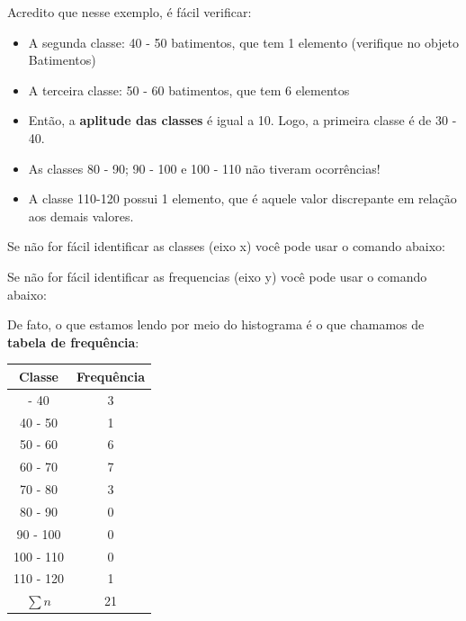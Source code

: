 \documentclass[
]{book}
\newenvironment{Shaded}{\begin{snugshade}}{\end{snugshade}}
\newcommand{\CommentTok}[1]{\textcolor[rgb]{0.56,0.35,0.01}{\textit{#1}}}
\newcommand{\FunctionTok}[1]{\textcolor[rgb]{0.13,0.29,0.53}{\textbf{#1}}}
\newcommand{\NormalTok}[1]{#1}
\newcommand{\SpecialCharTok}[1]{\textcolor[rgb]{0.81,0.36,0.00}{\textbf{#1}}}
\begin{document}
Acredito que nesse exemplo, é fácil verificar:

\begin{itemize}
\item
  A segunda classe: 40 - 50 batimentos, que tem 1 elemento (verifique no objeto Batimentos)
\item
  A terceira classe: 50 - 60 batimentos, que tem 6 elementos
\item
  Então, a \textbf{aplitude das classes} é igual a 10. Logo, a primeira classe é de 30 - 40.
\item
  As classes 80 - 90; 90 - 100 e 100 - 110 não tiveram ocorrências!
\item
  A classe 110-120 possui 1 elemento, que é aquele valor discrepante em relação aos demais valores.
\end{itemize}

Se não for fácil identificar as classes (eixo x) você pode usar o comando abaixo:

\begin{Shaded}
\end{Shaded}

Se não for fácil identificar as frequencias (eixo y) você pode usar o comando abaixo:

\begin{Shaded}
\end{Shaded}

De fato, o que estamos lendo por meio do histograma é o que chamamos de \textbf{tabela de frequência}:

\begin{longtable}[]{@{}cc@{}}
\toprule\noalign{}
Classe & Frequência \\
\midrule\noalign{}
\endhead
\bottomrule\noalign{}
\endlastfoot
30 - 40 & 3 \\
40 - 50 & 1 \\
50 - 60 & 6 \\
60 - 70 & 7 \\
70 - 80 & 3 \\
80 - 90 & 0 \\
90 - 100 & 0 \\
100 - 110 & 0 \\
110 - 120 & 1 \\
\(\sum n\) & 21 \\
\end{longtable}
\end{document}

